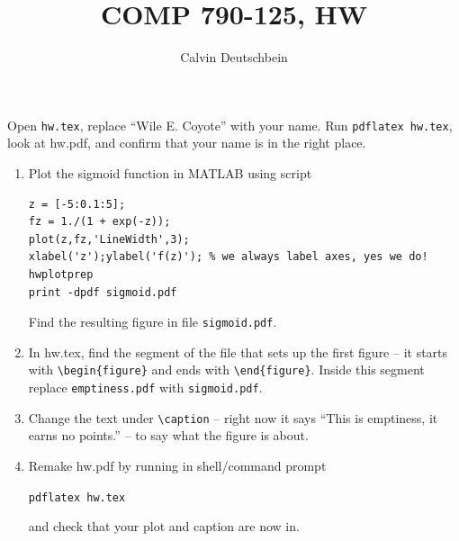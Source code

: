 \documentclass{article}
\begin{document}
\author{Calvin Deutschbein}
\title{COMP  790-125, HW\theHW}
\maketitle



\newproblem{0.01pt} Open \texttt{hw\theHW.tex}, replace ``Wile E. Coyote'' with your name. Run
\texttt{pdflatex hw\theHW.tex}, look at hw\theHW.pdf, and confirm that your name is in the right place.


\newproblem{0.5pt}
\begin{enumerate}
\item Plot the sigmoid function in MATLAB using script
\begin{verbatim}
z = [-5:0.1:5];
fz = 1./(1 + exp(-z));
plot(z,fz,'LineWidth',3);
xlabel('z');ylabel('f(z)'); % we always label axes, yes we do!
hwplotprep
print -dpdf sigmoid.pdf
\end{verbatim}
Find the resulting figure in file {\tt sigmoid.pdf}.
\item In hw\theHW.tex, find the segment of the file that sets up the first figure -- it starts with {\tt \textbackslash begin\{figure\}} and ends with  {\tt \textbackslash end\{figure\}}. Inside this segment  replace {\tt emptiness.pdf} with {\tt sigmoid.pdf}.
\item Change the text under {\tt \textbackslash caption} -- right now it says ``This is emptiness, it earns no points.'' -- to say what the figure is about.
\item Remake hw\theHW.pdf by running in shell/command prompt

     \texttt{pdflatex hw\theHW.tex}

and check that your plot and caption are now in.
\end{enumerate}
\end{document}
